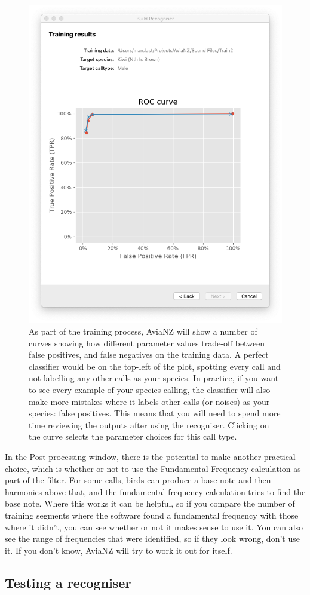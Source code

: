 \documentclass{article}
\begin{document}
        \begin{figure}[h]
    \centering
    \includegraphics[width=.4\textwidth]{Figs/Wizard_ROC}
    \caption{As part of the training process, AviaNZ will show a number of curves showing how different parameter values trade-off between false positives, and false negatives on the training data. A perfect classifier would be on the top-left of the plot, spotting every call and not labelling any other calls as your species. In practice, if you want to see every example of your species calling, the classifier will also make more mistakes where it labels other calls (or noises) as your species: false positives. This means that you will need to spend more time reviewing the outputs after using the recogniser. Clicking on the curve selects the parameter choices for this call type.}
    \label{fig:ROC}
    \end{figure}
In the Post-processing window, there is the potential to make another practical choice, which is whether or not to use the Fundamental Frequency calculation as part of the filter. For some calls, birds can produce a base note and then harmonics above that, and the fundamental frequency calculation tries to find the base note. Where this works it can be helpful, so if you compare the number of training segments where the software found a fundamental frequency with those where it didn't, you can see whether or not it makes sense to use it. You can also see the range of frequencies that were identified, so if they look wrong, don't use it. If you don't know, AviaNZ will try to work it out for itself. 




    

    
\subsection{Testing a recogniser}\label{sec:testfilter}
\end{document}

